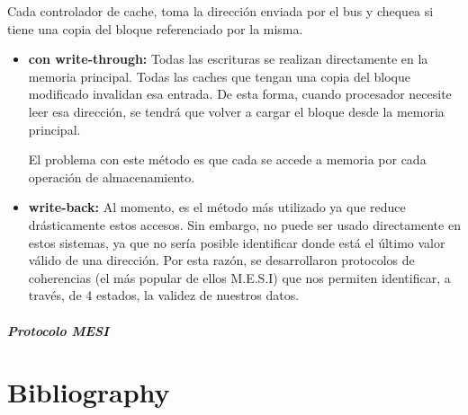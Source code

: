 Cada controlador de cache, toma la dirección enviada por el bus y chequea si tiene una copia del bloque referenciado por la misma.

\begin{itemize}
	\item \textbf{con write-through:} Todas las escrituras se realizan directamente en la memoria principal. Todas las caches que tengan una copia del bloque modificado invalidan esa entrada. De esta forma, cuando procesador necesite leer esa dirección, se tendrá que volver a cargar el bloque desde la memoria principal.
	
	El problema con este método es que cada se accede a memoria por cada operación de almacenamiento.
	
	\item  \textbf{write-back:} Al momento, es el método más utilizado ya que reduce drásticamente estos accesos. Sin embargo, no puede ser usado directamente en estos sistemas, ya que no sería posible identificar donde está el último valor válido de una dirección. Por esta razón, se desarrollaron protocolos de coherencias (el más popular de ellos M.E.S.I) que nos permiten identificar, a través, de 4 estados, la validez de nuestros datos.
\end{itemize}

\subsubsection{Protocolo MESI}

\newpage
\part*{Bibliography}
\nocite{*}
\printbibliography[keyword=intro,title={Introduccion}]
\printbibliography[keyword=ilp,title={Instruction Level Paralellism}]
\printbibliography[keyword=memory,title={Jerarquías de memoria}]


